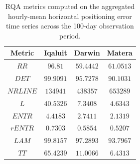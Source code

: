 \vspace{-3pt}
\begin{table}[H]
\caption{RQA metrics computed on the aggregated hourly-mean horizontal positioning error time series across the 100-day observation period.\label{tab:hourly_mean_rqa}}
\begin{tabularx}{\textwidth}{CCCC}
\toprule
\textbf{Metric} & \textbf{Iqaluit} & \textbf{Darwin} & \textbf{Matera} \\
\midrule
$RR$ & $96.81$ & $59.4442$ & $61.0513$ \\
$DET$ & $99.9091$ & $95.7278$ & $90.1031$ \\
$NRLINE$ & $134941$ & $438357$ & $653289$ \\
$L$ & $40.5326$ & $7.3408$ & $4.6343$ \\
$ENTR$ & $4.4183$ & $2.7411$ & $2.1319$ \\
$rENTR$ & $0.7303$ & $0.5854$ & $0.5207$ \\
$LAM$ & $99.8157$ & $97.2893$ & $93.7967$ \\
$TT$ & $65.4239$ & $11.0066$ & $6.4313$ \\
\bottomrule
\end{tabularx}
\end{table}
\vspace{-3pt}
